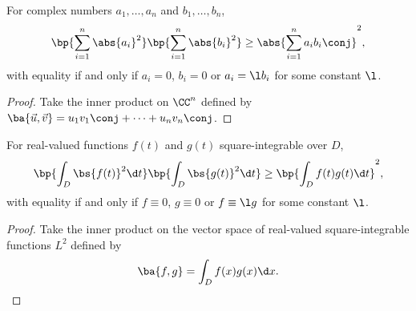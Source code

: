 \begin{corollary}
    For complex numbers $a_1, \dots, a_n$ and $b_1, \dots, b_n$, \[\bp{\sum_{i = 1}^n \abs{a_i}^2} \bp{\sum_{i = 1}^n \abs{b_i}^2} \geq \abs{\sum_{i =1}^n a_i b_i\conj}^2,\] with equality if and only if $a_i = 0$, $b_i = 0$ or $a_i = \l b_i$ for some constant $\l$.
\end{corollary}
\begin{proof}
    Take the inner product on $\CC^n$ defined by $\ba{\vec u, \vec v} = u_1 v_1 \conj + \dots + u_n v_n\conj$.
\end{proof}

\begin{corollary}
    For real-valued functions $f(t)$ and $g(t)$ square-integrable over $D$, \[\bp{\int_D \bs{f(t)}^2 \d t} \bp{\int_D \bs{g(t)}^2 \d t} \geq \bp{\int_D f(t)g(t) \d t}^2,\] with equality if and only if $f \equiv 0$, $g \equiv 0$ or $f \equiv \l g$ for some constant $\l$.
\end{corollary}
\begin{proof}
    Take the inner product on the vector space of real-valued square-integrable functions $L^2$ defined by \[\ba{f, g} = \int_D f(x)g(x) \d x.\]
\end{proof}